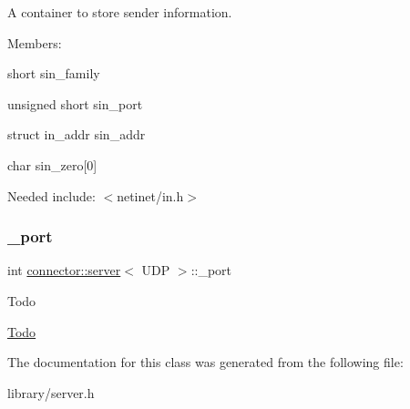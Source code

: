 A container to store sender information. 

Members\+:
\begin{DoxyItemize}
\item {\ttfamily short} sin\+\_\+family
\item {\ttfamily unsigned short} sin\+\_\+port
\item {\ttfamily struct} in\+\_\+addr sin\+\_\+addr
\item {\ttfamily char} sin\+\_\+zero\mbox{[}0\mbox{]}
\end{DoxyItemize}

Needed include\+: {\ttfamily $<$netinet/in.\+h$>$} \mbox{\label{classconnector_1_1server_3_01UDP_01_4_abea57798d63efe457207a47b16001599}} 
\subsubsection{\texorpdfstring{\+\_\+port}{\_port}}
{\footnotesize\ttfamily int \hyperlink{classconnector_1_1server}{connector\+::server}$<$ U\+DP $>$\+::\+\_\+port\hspace{0.3cm}{\ttfamily [private]}}

\begin{DoxyRefDesc}{Todo}
\item[\hyperlink{todo__todo000018}{Todo}]\end{DoxyRefDesc}


The documentation for this class was generated from the following file\+:\begin{DoxyCompactItemize}
\item 
library/server.\+h\end{DoxyCompactItemize}
